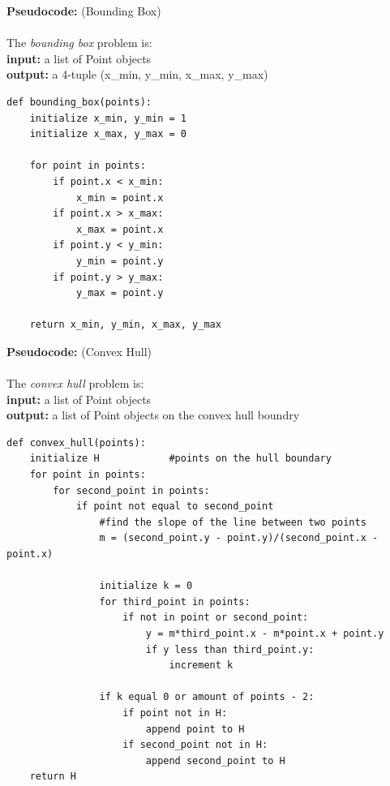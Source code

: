 \documentclass[09pt]{article}
\begin{document}
\noindent
\textbf{Pseudocode:} (Bounding Box) \\ \\
The \emph{bounding box} problem is: \\
\indent \textbf{input:} a list of Point objects \\
\indent \textbf{output:} a 4-tuple (x\_min, y\_min, x\_max, y\_max) \\
\begin{lstlisting}[frame=single]
def bounding_box(points):
	initialize x_min, y_min = 1
	initialize x_max, y_max = 0

	for point in points:
		if point.x < x_min:
			x_min = point.x
		if point.x > x_max:
			x_max = point.x
		if point.y < y_min:
			y_min = point.y
		if point.y > y_max:
			y_max = point.y
            
	return x_min, y_min, x_max, y_max
\end{lstlisting}
\vspace{1.25in}
\textbf{Pseudocode:} (Convex Hull) \\ \\
The \emph{convex hull} problem is: \\
\indent \textbf{input:} a list of Point objects \\
\indent \textbf{output:} a list of Point objects on the convex hull boundry\\
\begin{lstlisting}[frame=single]
def convex_hull(points):
	initialize H			#points on the hull boundary
	for point in points:
		for second_point in points:
			if point not equal to second_point
				#find the slope of the line between two points
				m = (second_point.y - point.y)/(second_point.x - point.x)
				
				initialize k = 0
				for third_point in points:
					if not in point or second_point:
						y = m*third_point.x - m*point.x + point.y
						if y less than third_point.y:
							increment k
						
				if k equal 0 or amount of points - 2:
					if point not in H:
						append point to H
					if second_point not in H:
						append second_point to H
	return H	
\end{lstlisting}
\end{document}
